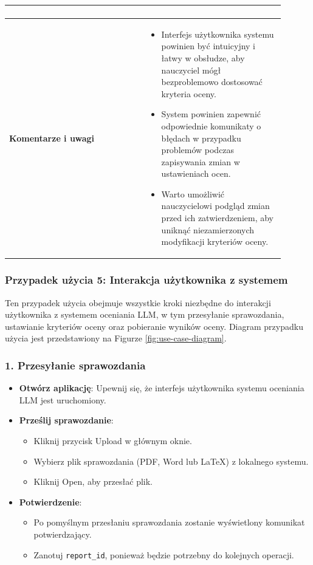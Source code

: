 \documentclass[a4paper, 12pt]{article}
\begin{document}
\begin{center}
\begin{longtable}{|p{0.45\linewidth}|p{0.45\linewidth}|}
\begin{enumerate}
\end{enumerate} \\
\hline
\textbf{Komentarze i uwagi} &
\begin{itemize}
    \item Interfejs użytkownika systemu powinien być intuicyjny i łatwy w obsłudze, aby nauczyciel mógł bezproblemowo dostosować kryteria oceny.
    \item System powinien zapewnić odpowiednie komunikaty o błędach w przypadku problemów podczas zapisywania zmian w ustawieniach ocen.
    \item Warto umożliwić nauczycielowi podgląd zmian przed ich zatwierdzeniem, aby uniknąć niezamierzonych modyfikacji kryteriów oceny.
\end{itemize} \\
\hline
\end{longtable}
\end{center}

\subsubsection{Przypadek użycia 5: Interakcja użytkownika z systemem}
Ten przypadek użycia obejmuje wszystkie kroki niezbędne do interakcji użytkownika z systemem oceniania LLM, w tym przesyłanie sprawozdania, ustawianie kryteriów oceny oraz pobieranie wyników oceny. Diagram przypadku użycia jest przedstawiony na Figurze \ref{fig:use-case-diagram}.

\subsubsection*{1. Przesyłanie sprawozdania}

\begin{itemize}
    \item \textbf{Otwórz aplikację}: Upewnij się, że interfejs użytkownika systemu oceniania LLM jest uruchomiony.
    \item \textbf{Prześlij sprawozdanie}:
    \begin{itemize}
        \item Kliknij przycisk Upload w głównym oknie.
        \item Wybierz plik sprawozdania (PDF, Word lub LaTeX) z lokalnego systemu.
        \item Kliknij Open, aby przesłać plik.
    \end{itemize}
    \item \textbf{Potwierdzenie}:
    \begin{itemize}
        \item Po pomyślnym przesłaniu sprawozdania zostanie wyświetlony komunikat potwierdzający.
        \item Zanotuj \texttt{report\_id}, ponieważ będzie potrzebny do kolejnych operacji.
    \end{itemize}
\end{itemize}
\end{document}
